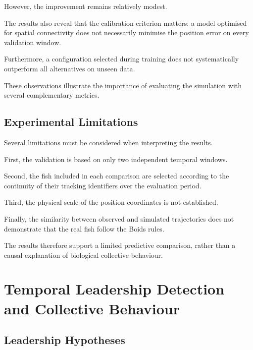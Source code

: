 \documentclass[10pt,a4paper]{article}
\newcommand{\esp}{\vspace*{2\bigskipamount}}
\begin{document}
However, the improvement remains
relatively modest.

The results also reveal that
the calibration criterion matters:
a model optimised for spatial
connectivity does not necessarily
minimise the position error
on every validation window.

Furthermore, a configuration
selected during training does
not systematically outperform
all alternatives on unseen data.

These observations illustrate
the importance of evaluating
the simulation with several
complementary metrics.

\subsection{Experimental Limitations}

Several limitations must be considered
when interpreting the results.

First, the validation is based
on only two independent
temporal windows.

Second, the fish included
in each comparison are selected
according to the continuity
of their tracking identifiers
over the evaluation period.

Third, the physical scale
of the position coordinates
is not established.

Finally, the similarity
between observed and simulated
trajectories does not demonstrate
that the real fish follow
the Boids rules.

The results therefore support
a limited predictive comparison,
rather than a causal explanation
of biological collective behaviour.

\esp


\section{Temporal Leadership Detection
and Collective Behaviour}
\label{app:leadership}
\subsection{Leadership Hypotheses}
\end{document}
